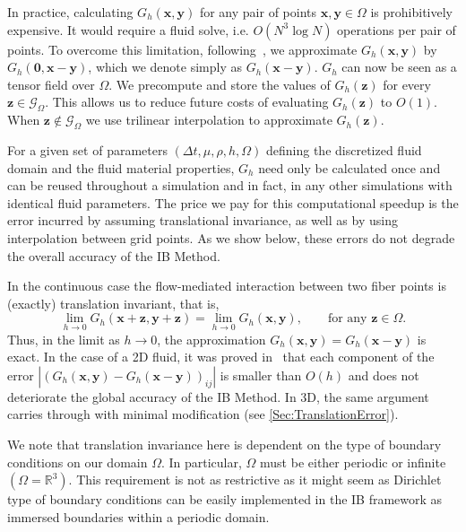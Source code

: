 \documentclass[preprint,12pt]{elsarticle}
\newcommand{\B}[1]{\mathbf{#1}}
\newcommand{\C}[1]{\mathcal{#1}}
\newcommand{\BB}[1]{\mathbb{#1}}
\renewcommand{\to}{\rightarrow}
\begin{document}
In practice, calculating $G_h(\B{x},\B{y})$ for any pair of points $\B{x},\B{y}\in\Omega$ is prohibitively expensive. It would require a fluid solve, i.e. $O(N^3\log N)$ operations per pair of points. To overcome this limitation, following~\cite{IBM_Implicit2D},  we approximate $G_h(\B{x},\B{y})$ by $G_h(\B{0}, \B{x}-\B{y})$, which we denote simply as $G_h(\B{x}-\B{y})$.
$G_h$ can now be seen as a tensor field over $\Omega$. We precompute and store the values of $G_h(\B{z})$ for every $\B{z}\in\C{G}_\Omega$. This allows us to reduce future costs of evaluating $G_h(\B{z})$ to $O(1)$. When $\B{z}\notin\C{G}_\Omega$ we use trilinear interpolation to approximate $G_h(\B{z})$.

For a given set of parameters $(\Delta t, \mu, \rho, h, \Omega)$ defining the discretized fluid domain and the fluid material properties, $G_h$ need only be calculated once and can be reused throughout a simulation and in fact,  in any other simulations with identical fluid parameters. The price we pay for this computational speedup is the error incurred by assuming translational invariance, as well as by using interpolation between grid points. As we show below, these errors do not degrade the overall accuracy of the IB Method.


In the continuous case the flow-mediated interaction between two fiber points is (exactly) translation invariant, that is,
\begin{equation}
\lim_{h\to 0} G_h(\B{x} + \B{z},\B{y} + \B{z}) = \lim_{h\to 0}G_h(\B{x},\B{y}), \qquad\text{for any $\B{z}\in\Omega$}.
\end{equation}
Thus, in the limit as $h\to 0$,  the approximation $G_h(\B{x},\B{y})=G_h(\B{x}-\B{y})$ is exact.
In the case of a 2D fluid, it was proved in~\cite{IBM_Implicit2D} that each component of the error $|(G_h(\B{x},\B{y})-G_h(\B{x}-\B{y}))_{ij}|$ is smaller than $O(h)$ and does not deteriorate the global accuracy of the IB Method. In 3D, the same argument carries through with minimal modification (see \ref{Sec:TranslationError}).

We note that translation invariance here is dependent on the type of boundary conditions on our domain $\Omega$. In particular, $\Omega$ must be either periodic or infinite $(\Omega = \BB{R}^3)$. This requirement is not as restrictive as it might seem as Dirichlet type of boundary conditions can be  easily implemented in the IB framework as immersed boundaries within a periodic domain.
\end{document}

